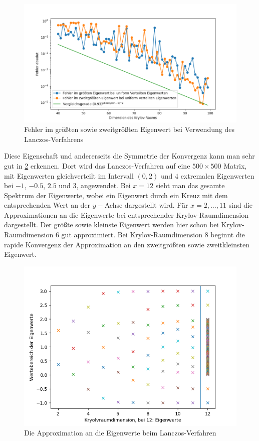 \documentclass{article}
\theoremstyle{plain}
\begin{document}
\begin{figure}[H]
	\centering
	\includegraphics[width = 0.6 \linewidth]{Plots/error_uniform}
	\caption{Fehler im größten sowie zweitgrößten Eigenwert bei Verwendung des Lanczos-Verfahrens}
	\label{error_uniform}
\end{figure}

Diese Eigenschaft und andererseits die Symmetrie der Konvergenz kann man sehr gut in \ref{eigv_lanczos} erkennen. Dort wird das Lanczos-Verfahren auf eine $500 \times 500$ Matrix, mit Eigenwerten gleichverteilt im Intervall $(0,2)$ und $4$ extremalen Eigenwerten bei $-1$, $-0.5$, $2.5$ und $3$, angewendet. Bei $x = 12$ sieht man das gesamte Spektrum der Eigenwerte, wobei ein Eigenwert durch ein Kreuz mit dem entsprechenden Wert an der $y-$Achse dargestellt wird. Für $x = 2,...,11$ sind die Approximationen an die Eigenwerte bei entsprechender Krylov-Raumdimension dargestellt. Der größte sowie kleinste Eigenwert werden hier schon bei Krylov-Raumdimension $6$ gut approximiert. Bei Krylov-Raumdimension $8$ beginnt die rapide Konvergenz der Approximation an den zweitgrößten sowie zweitkleinsten Eigenwert.


\begin{figure}[H]
	\centering
	\includegraphics[width = 0.7 \linewidth]{Plots/eigv_kyrlov_approx}
	\caption{Die Approximation an die Eigenwerte beim Lanczos-Verfahren}
	\label{eigv_lanczos}
\end{figure}
\end{document}
